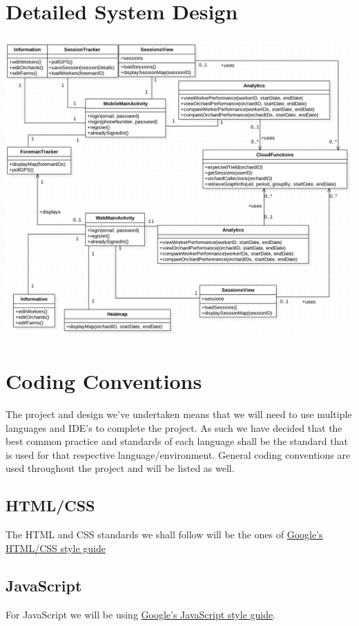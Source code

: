 \documentclass[12pt]{article}
\begin{document}
\section{Detailed System Design}
\includegraphics[width=1.2\linewidth]{UMLClassDiag.png}
\newpage

\section{Coding Conventions}
\flushleft
  The project and design we've undertaken means that we will need to use multiple languages and IDE's to complete the project. As such we have decided that the best common practice and standards of each language shall be the standard that is used for that respective language/environment. General coding conventions are used throughout the project and will be listed as well.
  \subsection{HTML/CSS}
  The HTML and CSS standards we shall follow will be the ones of \href{https://google.github.io/styleguide/htmlcssguide.html}{Google's HTML/CSS style guide}
  
  \subsection{JavaScript}
  For JavaScript we will be using \href{https://google.github.io/styleguide/jsguide.html}{Google's JavaScript style guide}.
  
\end{document}

